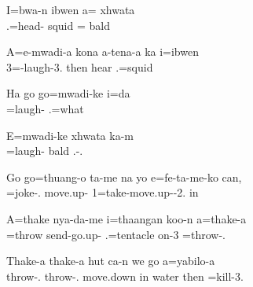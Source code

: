 \z
\ea%

\gll I=bwa-n ibwen a= xhwata\\ 
.=head- squid = bald\\ 
\glt {}

\z
\ea%

\gll A=e-mwadi-a kona a-tena-a ka i=ibwen\\ 3=-laugh-3. then hear  .=squid\\ \glt {}

\z
\ea%

\gll Ha go go=mwadi-ke i=da\\ 
  =laugh- .=what\\ 
\glt {}

\z
\ea%

\gll E=mwadi-ke xhwata ka-m\\ 
=laugh- bald .-.\\ 
\glt {}
\z
\ea%

\gll Go go=thuang-o ta-me na yo e=fe-ta-me-ko can, \\  =joke-. move.up-   1=take-move.up--2. in\\ \glt {}

\z

\ea

\gll A=thake nya-da-me i=thaangan koo-n a=thake-a\\  =throw send-go.up- .=tentacle on-3 =throw-.\\ \glt {}
\z
\pagebreak

\ea%
\gll Thake-a thake-a hut ca-n we go a=yabilo-a\\ throw-. throw-. move.down in water then =kill-3.\\ 
\glt {}
\z
\ea%

